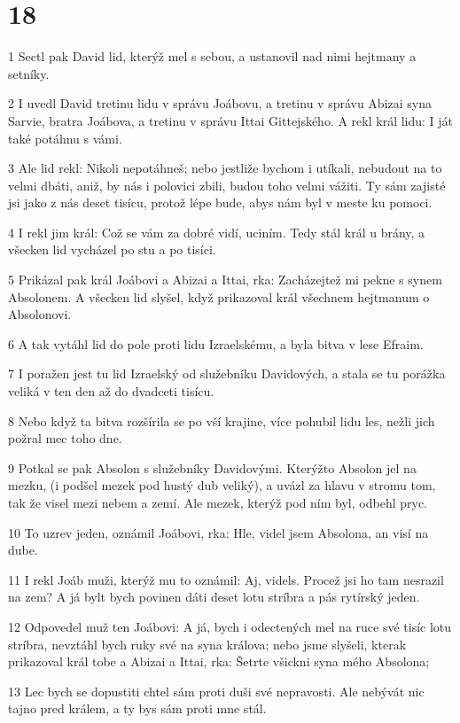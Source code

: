 \chapter{18}

\par 1 Sectl pak David lid, kterýž mel s sebou, a ustanovil nad nimi hejtmany a setníky.
\par 2 I uvedl David tretinu lidu v správu Joábovu, a tretinu v správu Abizai syna Sarvie, bratra Joábova, a tretinu v správu Ittai Gittejského. A rekl král lidu: I ját také potáhnu s vámi.
\par 3 Ale lid rekl: Nikoli nepotáhneš; nebo jestliže bychom i utíkali, nebudout na to velmi dbáti, aniž, by nás i polovici zbili, budou toho velmi vážiti. Ty sám zajisté jsi jako z nás deset tisícu, protož lépe bude, abys nám byl v meste ku pomoci.
\par 4 I rekl jim král: Což se vám za dobré vidí, uciním. Tedy stál král u brány, a všecken lid vycházel po stu a po tisíci.
\par 5 Prikázal pak král Joábovi a Abizai a Ittai, rka: Zacházejtež mi pekne s synem Absolonem. A všecken lid slyšel, když prikazoval král všechnem hejtmanum o Absolonovi.
\par 6 A tak vytáhl lid do pole proti lidu Izraelskému, a byla bitva v lese Efraim.
\par 7 I poražen jest tu lid Izraelský od služebníku Davidových, a stala se tu porážka veliká v ten den až do dvadceti tisícu.
\par 8 Nebo když ta bitva rozšírila se po vší krajine, více pohubil lidu les, nežli jich požral mec toho dne.
\par 9 Potkal se pak Absolon s služebníky Davidovými. Kterýžto Absolon jel na mezku, (i podšel mezek pod hustý dub veliký), a uvázl za hlavu v stromu tom, tak že visel mezi nebem a zemí. Ale mezek, kterýž pod ním byl, odbehl pryc.
\par 10 To uzrev jeden, oznámil Joábovi, rka: Hle, videl jsem Absolona, an visí na dube.
\par 11 I rekl Joáb muži, kterýž mu to oznámil: Aj, videls. Procež jsi ho tam nesrazil na zem? A já bylt bych povinen dáti deset lotu stríbra a pás rytírský jeden.
\par 12 Odpovedel muž ten Joábovi: A já, bych i odectených mel na ruce své tisíc lotu stríbra, nevztáhl bych ruky své na syna králova; nebo jsme slyšeli, kterak prikazoval král tobe a Abizai a Ittai, rka: Šetrte všickni syna mého Absolona;
\par 13 Lec bych se dopustiti chtel sám proti duši své nepravosti. Ale nebývát nic tajno pred králem, a ty bys sám proti mne stál.
